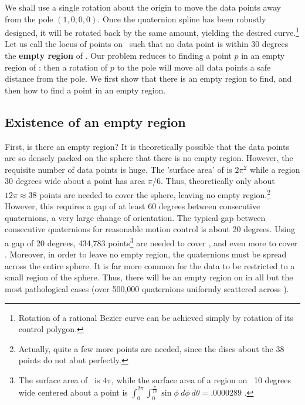 We shall use a single rotation about the origin 
to move the data points away from the pole $(1,0,0,0)$.
Once the quaternion spline has been robustly designed, 
it will be rotated back by the same amount, 
yielding the desired curve.\footnote{Rotation of a rational 
	Bezier curve can be achieved simply by
	rotation of its control polygon.}
Let us call the locus of points on \ such that
no data point is within 30 degrees the {\bf empty region} of .
Our problem reduces to finding a point $p$ in an empty region of :
then a rotation of $p$ to the pole will move all data points a safe
distance from the pole.
We first show that there is an empty region to find,
and then how to find a point in an empty region.

\subsection{Existence of an empty region}

First, is there an empty region?
It is theoretically possible that the data points are so densely packed
on the sphere that there is no empty region.
However, the requisite number of data points is huge.
The 'surface area' of  is $2\pi^2$ \cite{kendall61}
while a region 30 degrees wide about a point has area $\pi/6$.
Thus, theoretically only about $12\pi \approx 38$ points are needed to
cover the sphere, leaving no empty region.\footnote{Actually, quite
	a few more points are needed, since the discs about the 38 points
	do not abut perfectly.}
However, this requires a gap of at least 60 degrees between 
consecutive quaternions, a very large change of orientation.
The typical gap between consecutive quaternions for reasonable
motion control is about 20 degrees.
Using a gap of 20 degrees, 434,783 points\footnote{The surface area 
	of \ is $4\pi$, while the surface area
	of a region on \ 10 degrees wide centered about a point is 
	$\int_{0}^{2\pi} \int_0^{\frac{\pi}{18}}  \sin \phi \ d\phi \ d\theta
	= .0000289$ \cite{lang79}.}
are needed to cover , and even more to cover .
Moreover, in order to leave no empty region, the quaternions
must be spread across the entire sphere.
It is far more common for the data to be restricted to a small region
of the sphere.
Thus, there will be an empty region on  in all but the most
pathological cases (over 500,000 quaternions uniformly scattered across
).

